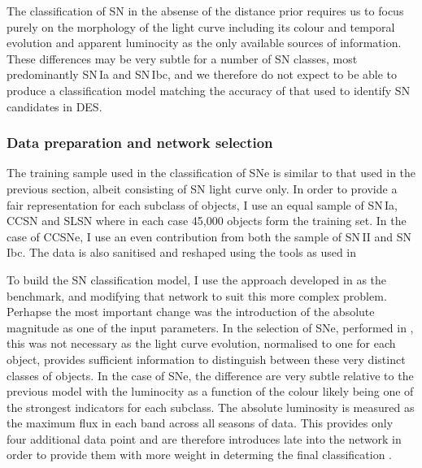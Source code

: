 The classification of SN in the absense of the distance prior requires us to focus purely on the morphology of the light curve including its colour and temporal evolution and apparent luminocity as the only available sources of information. These differences may be very subtle for a number of SN classes, most predominantly SN\,Ia and SN\,Ibc, and we therefore do not expect to be able to produce a classification model matching the accuracy of that used to identify SN candidates in DES.

\subsubsection{Data preparation and network selection} \label{sec:SNClassificationNetwork}
The training sample used in the classification of SNe is similar to that used in the previous section, albeit consisting of SN light curve only. In order to provide a fair representation for each subclass of objects, I use an equal sample of SN\,Ia, CCSN and SLSN where in each case 45,000 objects form the training set. In the case of CCSNe, I use an even contribution from both the sample of SN\,II and SN\,Ibc. The data is also sanitised and reshaped using the tools as used in 

To build the SN classification model, I use the approach developed in  as the benchmark, and modifying that network to suit this more complex problem. Perhapse the most important change was the introduction of the absolute magnitude as one of the input parameters. In the selection of SNe, performed in , this was not necessary as the light curve evolution, normalised to one for each object, provides sufficient information to distinguish between these very distinct classes of objects. In the case of SNe, the difference are very subtle relative to the previous model with the luminocity as a function of the colour likely being one of the strongest indicators for each subclass. The absolute luminosity is measured as the maximum flux in each band across all seasons of data. This provides only four additional data point and are therefore introduces late into the network in order to provide them with more weight in determing the final classification .

